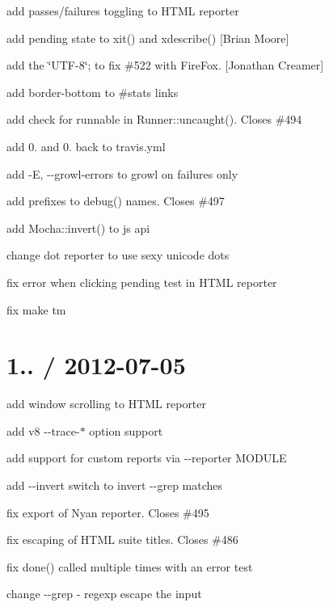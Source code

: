 \begin{DoxyItemize}
\item add passes/failures toggling to H\+T\+ML reporter
\item add pending state to {\ttfamily xit()} and {\ttfamily xdescribe()} \mbox{[}Brian Moore\mbox{]}
\item add the  \char`\"{}\+U\+T\+F-\/8\char`\"{}; to fix \#522 with Fire\+Fox. \mbox{[}Jonathan Creamer\mbox{]}
\item add border-\/bottom to \#stats links
\item add check for runnable in {\ttfamily Runner\+::uncaught()}. Closes \#494
\item add 0. and 0. back to travis.\+yml
\item add {\ttfamily -\/E, -\/-\/growl-\/errors} to growl on failures only
\item add prefixes to debug() names. Closes \#497
\item add {\ttfamily Mocha\+::invert()} to js api
\item change dot reporter to use sexy unicode dots
\item fix error when clicking pending test in H\+T\+ML reporter
\item fix {\ttfamily make tm}
\end{DoxyItemize}

\section*{1.. / 2012-\/07-\/05}


\begin{DoxyItemize}
\item add window scrolling to {\ttfamily H\+T\+ML} reporter
\item add v8 {\ttfamily -\/-\/trace-\/$\ast$} option support
\item add support for custom reports via {\ttfamily -\/-\/reporter M\+O\+D\+U\+LE}
\item add {\ttfamily -\/-\/invert} switch to invert {\ttfamily -\/-\/grep} matches
\item fix export of {\ttfamily Nyan} reporter. Closes \#495
\item fix escaping of {\ttfamily H\+T\+ML} suite titles. Closes \#486
\item fix {\ttfamily done()} called multiple times with an error test
\item change {\ttfamily -\/-\/grep} -\/ regexp escape the input
\end{DoxyItemize}

